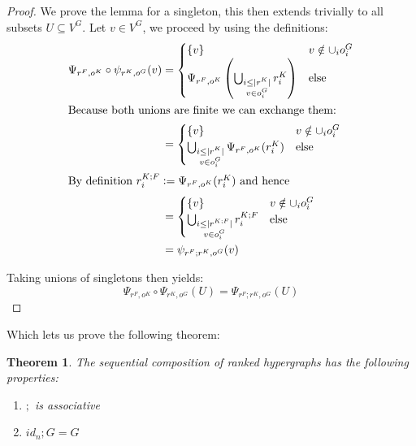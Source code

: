 \documentclass[12pt]{article}
\newtheorem{theorem}{Theorem}[section]
\theoremstyle{definition}
\newcommand{\defeq}{\vcentcolon=}
\newcommand{\1}{\mathbbm{1}}
\newcommand{\seq}{;}
\begin{document}
\begin{proof}
    We prove the lemma for a singleton, this then extends trivially to all subsets $U\subseteq V^G$. Let $v\in V^G$, we proceed by using the definitions:
    \begin{align*}
        \Psi_{r^F, o^K}\circ \psi_{r^K, o^G}(v) &= 
        \begin{cases}
            \{v\} & v\notin \cup_i o_i^G\\
            \Psi_{r^F, o^K}\left(\bigcup_{\substack{i \leq |r^K| \\ v \in o^G_i}} r^K_i\right) & \text{else}
        \end{cases}\\
        \intertext{Because both unions are finite we can exchange them: }
        &= 
        \begin{cases}
            \{v\} & v\notin \cup_i o_i^G\\
            \bigcup_{\substack{i \leq |r^K| \\ v \in o^G_i}} \Psi_{r^F, o^K} (r^K_i) & \text{else}\\
        \end{cases}\\
        \intertext{By definition $r^{K\seq F}_i \defeq \Psi_{r^F, o^K} (r^K_i)$ and hence}
        &=
        \begin{cases}
            \{v\} & v\notin \cup_i o_i^G\\
            \bigcup_{\substack{i\leq  |r^{K\seq F}| \\ v \in o^G_i}} r^{K\seq F}_i & \text{else}\\
        \end{cases}\\
        &= \psi_{r^F\seq r^K, o^G}(v)
    \end{align*}

    Taking unions of singletons then yields:
    \[
        \Psi_{r^F, o^K}\circ \Psi_{r^K, o^G}(U) = \Psi_{r^F\seq r^K, o^G}(U)
    \]
\end{proof}

Which lets us prove the following theorem:

\begin{theorem}\label{thm:assoc}
The sequential composition of ranked hypergraphs has the following properties:
    \begin{enumerate}
        \item $\seq$ is associative
        \item $id_n \seq G = G$
    \end{enumerate}
\end{theorem}
\end{document}
